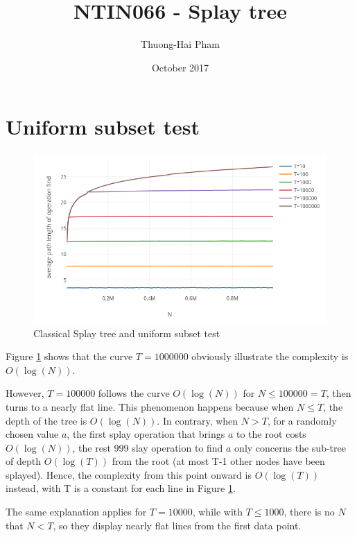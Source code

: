 \documentclass{article}
\title{NTIN066 - Splay tree}
\author{Thuong-Hai Pham}
\date{October 2017}
\begin{document}
\maketitle

\section{Uniform subset test} \label{uni}

\begin{figure}[ht]
\centering
\includegraphics[width=\textwidth]{NTIN066-plot1.png}
\caption{Classical Splay tree and uniform subset test}
\label{fig:plot1}
\end{figure}

Figure \ref{fig:plot1} shows that the curve $T=1000000$ obviously illustrate the complexity is $O(\log(N))$.

However, $T=100000$ follows the curve $O(\log(N))$ for $N\le100000=T$, then turns to a nearly flat line. This phenomenon happens because when $N\le T$, the depth of the tree is $O(\log(N))$. In contrary, when $N>T$, for a randomly chosen value $a$, the first splay operation that brings $a$ to the root costs $O(\log(N))$, the rest 999 slay operation to find $a$ only concerns the sub-tree of depth $O(\log(T))$ from the root (at most T-1 other nodes have been splayed). Hence, the complexity from this point onward is $O(\log(T))$ instead, with T is a constant for each line in Figure \ref{fig:plot1}.

The same explanation applies for $T=10000$, while with $T\le 1000$, there is no $N$ that $N<T$, so they display nearly flat lines from the first data point.
\end{document}
